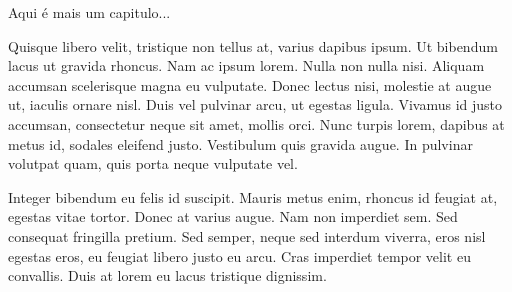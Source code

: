 \documentclass[
	12pt,				%
	oneside,			%
	a4paper,			%
	chapter=TITLE,		%
	english,			%
	brazil,				%
	]{custom-unisagrado}
\begin{document}
Aqui é mais um capitulo...

Quisque libero velit, tristique non tellus at, varius dapibus ipsum. Ut bibendum lacus ut gravida rhoncus. Nam ac ipsum lorem. Nulla non nulla nisi. Aliquam accumsan scelerisque magna eu vulputate. Donec lectus nisi, molestie at augue ut, iaculis ornare nisl. Duis vel pulvinar arcu, ut egestas ligula. Vivamus id justo accumsan, consectetur neque sit amet, mollis orci. Nunc turpis lorem, dapibus at metus id, sodales eleifend justo. Vestibulum quis gravida augue. In pulvinar volutpat quam, quis porta neque vulputate vel.

Integer bibendum eu felis id suscipit. Mauris metus enim, rhoncus id feugiat at, egestas vitae tortor. Donec at varius augue. Nam non imperdiet sem. Sed consequat fringilla pretium. Sed semper, neque sed interdum viverra, eros nisl egestas eros, eu feugiat libero justo eu arcu. Cras imperdiet tempor velit eu convallis. Duis at lorem eu lacus tristique dignissim.

\postextual




\end{document}
